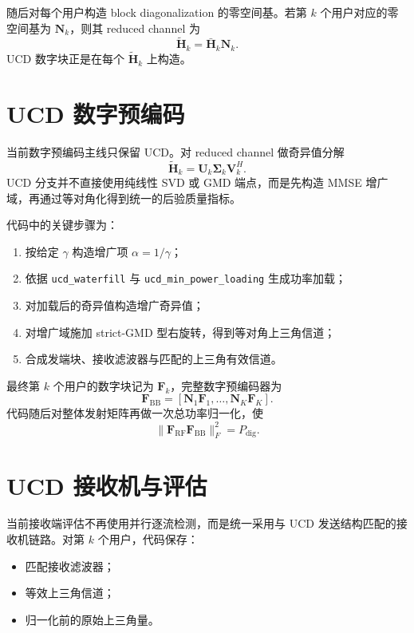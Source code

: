 \documentclass[11pt]{ctexart}
\newcommand{\code}[1]{\texttt{#1}}
\begin{document}
随后对每个用户构造 block diagonalization 的零空间基。若第 $k$ 个用户对应的零空间基为 $\bm{N}_k$，则其 reduced channel 为
\begin{equation}
    \widetilde{\bm{H}}_k = \bar{\bm{H}}_k \bm{N}_k.
\end{equation}
UCD 数字块正是在每个 $\widetilde{\bm{H}}_k$ 上构造。

\section{UCD 数字预编码}
当前数字预编码主线只保留 UCD。对 reduced channel 做奇异值分解
\begin{equation}
    \widetilde{\bm{H}}_k = \bm{U}_k \bm{\Sigma}_k \bm{V}_k^H.
\end{equation}
UCD 分支并不直接使用纯线性 SVD 或 GMD 端点，而是先构造 MMSE 增广域，再通过等对角化得到统一的后验质量指标。

代码中的关键步骤为：
\begin{enumerate}
    \item 按给定 $\gamma$ 构造增广项 $\alpha = 1/\gamma$；
    \item 依据 \code{ucd\_waterfill} 与 \code{ucd\_min\_power\_loading} 生成功率加载；
    \item 对加载后的奇异值构造增广奇异值；
    \item 对增广域施加 strict-GMD 型右旋转，得到等对角上三角信道；
    \item 合成发端块、接收滤波器与匹配的上三角有效信道。
\end{enumerate}

最终第 $k$ 个用户的数字块记为 $\bm{F}_k$，完整数字预编码器为
\begin{equation}
    \bm{F}_{\mathrm{BB}}
    =
    \left[
        \bm{N}_1 \bm{F}_1,\ldots,\bm{N}_K \bm{F}_K
    \right].
\end{equation}
代码随后对整体发射矩阵再做一次总功率归一化，使
\begin{equation}
    \|\bm{F}_{\mathrm{RF}}\bm{F}_{\mathrm{BB}}\|_F^2 = P_{\mathrm{dig}}.
\end{equation}

\section{UCD 接收机与评估}
当前接收端评估不再使用并行逐流检测，而是统一采用与 UCD 发送结构匹配的接收机链路。对第 $k$ 个用户，代码保存：
\begin{itemize}
    \item 匹配接收滤波器；
    \item 等效上三角信道；
    \item 归一化前的原始上三角量。
\end{itemize}
\end{document}
